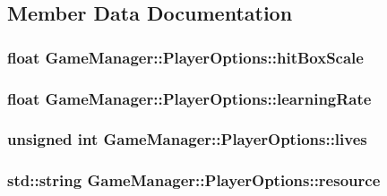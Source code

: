 \subsection{Member Data Documentation}
\hypertarget{struct_game_manager_1_1_player_options_af610d501999845b0a927ce4522cc7ac9}{
\subsubsection[{hitBoxScale}]{\setlength{\rightskip}{0pt plus 5cm}float {\bf GameManager::PlayerOptions::hitBoxScale}}}
\label{d1/d06/struct_game_manager_1_1_player_options_af610d501999845b0a927ce4522cc7ac9}
\hypertarget{struct_game_manager_1_1_player_options_a4e5e2e7f473e9b024378cb6a4584de59}{
\subsubsection[{learningRate}]{\setlength{\rightskip}{0pt plus 5cm}float {\bf GameManager::PlayerOptions::learningRate}}}
\label{d1/d06/struct_game_manager_1_1_player_options_a4e5e2e7f473e9b024378cb6a4584de59}
\hypertarget{struct_game_manager_1_1_player_options_a4df53166eb1cd9e4b53ab3f7e34b5fc7}{
\subsubsection[{lives}]{\setlength{\rightskip}{0pt plus 5cm}unsigned int {\bf GameManager::PlayerOptions::lives}}}
\label{d1/d06/struct_game_manager_1_1_player_options_a4df53166eb1cd9e4b53ab3f7e34b5fc7}
\hypertarget{struct_game_manager_1_1_player_options_a6de1d4b6f906eda7e334b1a00d503379}{
\subsubsection[{resource}]{\setlength{\rightskip}{0pt plus 5cm}std::string {\bf GameManager::PlayerOptions::resource}}}
